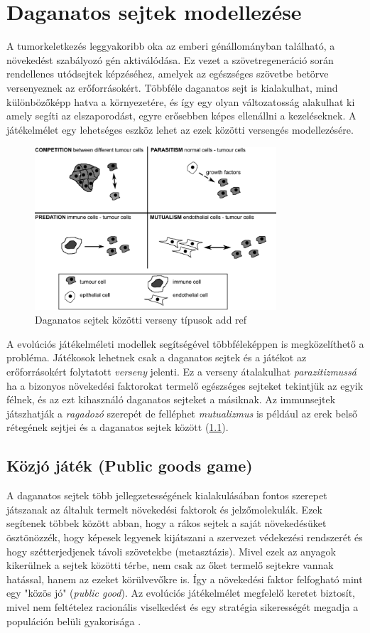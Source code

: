 \chapter{Daganatos sejtek modellezése}
A tumorkeletkezés leggyakoribb oka az emberi génállományban található, a növekedést szabályozó gén aktiválódása. Ez vezet a szövetregeneráció során rendellenes utódsejtek képzéséhez, amelyek az egészséges szövetbe betörve versenyeznek az erőforrásokért. Többféle daganatos sejt is kialakulhat, mind különbözőképp hatva a környezetére, és így egy olyan változatosság alakulhat ki amely segíti az elszaporodást, egyre erősebben képes ellenállni a kezeléseknek. A játékelmélet egy lehetséges eszköz lehet az ezek közötti versengés modellezésére.

\begin{figure}[h!]
	\centering
	\includegraphics[width=90mm]{images/models}
	\vspace*{2mm}
	\caption{Daganatos sejtek közötti verseny típusok add ref}
	\label{fig:cancerModels}
\end{figure}

A evolúciós játékelméleti modellek segítségével többféleképpen is megközelíthető a probléma. Játékosok lehetnek csak a daganatos sejtek és a játékot az erőforrásokért folytatott \textit{verseny} jelenti. Ez a verseny átalakulhat \textit{parazitizmussá} ha a bizonyos növekedési faktorokat termelő egészséges sejteket tekintjük az egyik félnek, és az ezt kihasználó daganatos sejteket a másiknak. Az immunsejtek játszhatják a \textit{ragadozó} szerepét de felléphet \textit{mutualizmus} is például az erek belső rétegének sejtjei és a daganatos sejtek között (\ref{fig:cancerModels}). 

\section{Közjó játék (Public goods game)}
A daganatos sejtek több jellegzetességének kialakulásában fontos szerepet játszanak az általuk termelt növekedési faktorok és jelzőmolekulák. Ezek segítenek többek között abban, hogy a rákos sejtek a saját növekedésüket ösztönözzék, hogy képesek legyenek kijátszani a szervezet védekezési rendszerét és hogy szétterjedjenek távoli szövetekbe (metasztázis). Mivel ezek az anyagok kikerülnek a sejtek közötti térbe, nem csak az őket termelő sejtekre vannak hatással, hanem az ezeket körülvevőkre is. Így a növekedési faktor felfogható mint egy "közös jó" (\textit{public good}). Az evolúciós játékelmélet megfelelő keretet biztosít, mivel nem feltételez racionális viselkedést és egy stratégia sikerességét megadja a populáción belüli gyakorisága \cite{archetti2016cooperation}.

